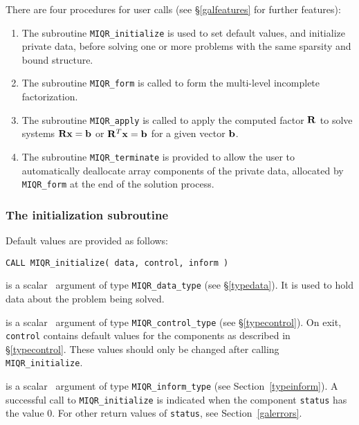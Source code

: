 \documentclass{galahad}
\newcommand{\packagename}{MIQR}
\begin{document}

\galarguments
There are four procedures for user calls
(see \S\ref{galfeatures} for further features): 

\begin{enumerate}
\item The subroutine 
      {\tt \packagename\_initialize} 
      is used to set default values, and initialize private data, 
      before solving one or more problems with the
      same sparsity and bound structure.
\item The subroutine 
      {\tt \packagename\_form} 
      is called to form the  multi-level incomplete factorization.
\item The subroutine 
      {\tt \packagename\_apply} 
      is called to apply the computed factor ${\mathbf{R}}$ to solve systems 
      ${\mathbf{R}} {\mathbf{x}} = {\mathbf{b}}$ or ${\mathbf{R}}^T {\mathbf{x}} = {\mathbf{b}}$ 
      for a given vector ${\mathbf{b}}$.
\item The subroutine 
      {\tt \packagename\_terminate} 
      is provided to allow the user to automatically deallocate array 
       components of the private data, allocated by 
       {\tt \packagename\_form} 
       at the end of the solution process. 
\end{enumerate}


\subsubsection{The initialization subroutine}\label{subinit}
 Default values are provided as follows:
\vspace*{1mm}

\hspace{8mm}
{\tt CALL \packagename\_initialize( data, control, inform )}

\vspace*{-3mm}
\begin{description}

 is a scalar \intentinout\ argument of type 
{\tt \packagename\_data\_type}
(see \S\ref{typedata}). It is used to hold data about the problem being 
solved. 

 is a scalar \intentout\ argument of type 
{\tt \packagename\_control\_type}
(see \S\ref{typecontrol}). 
On exit, {\tt control} contains default values for the components as
described in \S\ref{typecontrol}.
These values should only be changed after calling 
{\tt \packagename\_initialize}.

 is a scalar \intentout\ argument of type 
{\tt \packagename\_inform\_type}
(see Section~\ref{typeinform}). A successful call to
{\tt \packagename\_initialize}
is indicated when the  component {\tt status} has the value 0. 
For other return values of {\tt status}, see Section~\ref{galerrors}.

\end{description}
\end{document}
